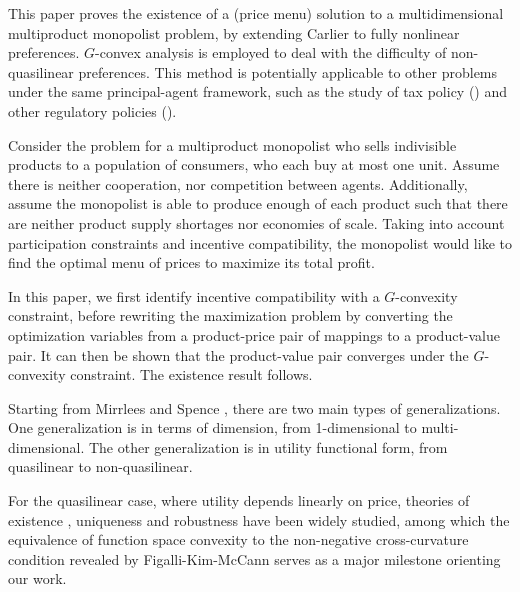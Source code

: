 \documentclass[a4paper, 11pt]{amsart}
\numberwithin{equation}{section}
\theoremstyle{plain}
\theoremstyle{definition}
\theoremstyle{remark}
\begin{document}
	This paper proves the existence of a (price menu) solution to a multidimensional multiproduct monopolist problem, {by extending} %
	Carlier \cite{Carlier01} to fully nonlinear preferences. $G$-convex analysis is employed to deal with the difficulty of non-quasilinear preferences. This method is potentially applicable to other problems under the same principal-agent framework, such as the study of tax policy (\cite{Mirrlees71}) and other regulatory policies (\cite{BaronMyerson82}). \medskip

	


	Consider the problem for a multiproduct monopolist who sells indivisible products to a population of consumers, who each buy at most one unit. Assume there is neither cooperation, nor competition between agents. Additionally, assume the monopolist is able to produce enough of each product such that there are neither product supply shortages {nor economies of scale}. Taking into account participation constraints and incentive compatibility, the monopolist would like to find the optimal menu of prices to maximize its total profit.\medskip

	In this paper, we first identify incentive compatibility with a $G$-convexity constraint, before rewriting the maximization problem by converting the optimization variables from a product-price pair of mappings to a product-value pair. It can then be shown that the product-value pair converges under the $G$-convexity constraint. The existence result follows. \medskip






	
Starting from Mirrlees \cite{Mirrlees71} and Spence \cite{Spence74}, there are two main types of generalizations. One generalization is in terms of dimension, from 1-dimensional to multi-dimensional. The other generalization is in utility functional form, from quasilinear to non-quasilinear.\medskip



For the quasilinear case, where utility depends linearly on price, theories of existence \cite{Basov05,RochetStole03,Carlier01,MonteiroPage98}, uniqueness \cite{CarlierLachand-Robert01,MussaRosen78,RochetChone98} and robustness \cite{BaronMyerson82,FigalliKimMcCann11} have been widely studied, among which the equivalence of function space convexity to the non-negative cross-curvature condition revealed by Figalli-Kim-McCann \cite{FigalliKimMcCann11} serves as a major milestone {orienting our work}. \medskip
\end{document}
